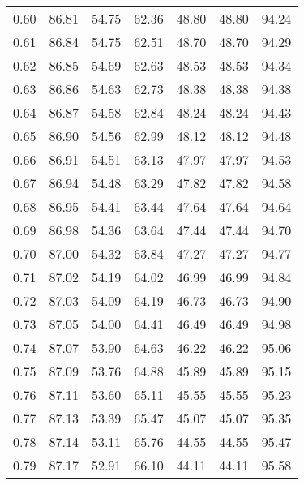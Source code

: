 \begin{tabular}{|c|c|c|c|c|c|c|}
      0.60 &     86.81 &     54.75 &      62.36 &   48.80 &      48.80 &         94.24 \\
      0.61 &     86.84 &     54.75 &      62.51 &   48.70 &      48.70 &         94.29 \\
      0.62 &     86.85 &     54.69 &      62.63 &   48.53 &      48.53 &         94.34 \\
      0.63 &     86.86 &     54.63 &      62.73 &   48.38 &      48.38 &         94.38 \\
      0.64 &     86.87 &     54.58 &      62.84 &   48.24 &      48.24 &         94.43 \\
      0.65 &     86.90 &     54.56 &      62.99 &   48.12 &      48.12 &         94.48 \\
      0.66 &     86.91 &     54.51 &      63.13 &   47.97 &      47.97 &         94.53 \\
      0.67 &     86.94 &     54.48 &      63.29 &   47.82 &      47.82 &         94.58 \\
      0.68 &     86.95 &     54.41 &      63.44 &   47.64 &      47.64 &         94.64 \\
      0.69 &     86.98 &     54.36 &      63.64 &   47.44 &      47.44 &         94.70 \\
      0.70 &     87.00 &     54.32 &      63.84 &   47.27 &      47.27 &         94.77 \\
      0.71 &     87.02 &     54.19 &      64.02 &   46.99 &      46.99 &         94.84 \\
      0.72 &     87.03 &     54.09 &      64.19 &   46.73 &      46.73 &         94.90 \\
      0.73 &     87.05 &     54.00 &      64.41 &   46.49 &      46.49 &         94.98 \\
      0.74 &     87.07 &     53.90 &      64.63 &   46.22 &      46.22 &         95.06 \\
      0.75 &     87.09 &     53.76 &      64.88 &   45.89 &      45.89 &         95.15 \\
      0.76 &     87.11 &     53.60 &      65.11 &   45.55 &      45.55 &         95.23 \\
      0.77 &     87.13 &     53.39 &      65.47 &   45.07 &      45.07 &         95.35 \\
      0.78 &     87.14 &     53.11 &      65.76 &   44.55 &      44.55 &         95.47 \\
      0.79 &     87.17 &     52.91 &      66.10 &   44.11 &      44.11 &         95.58 \\

\end{tabular}
